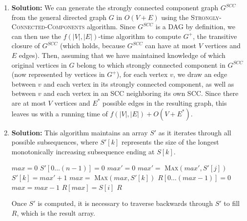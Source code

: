 \documentclass{article}
\begin{document}
\begin{enumerate}
\item \textbf{Solution:}
We can generate the strongly connected component graph $G^{SCC}$ from the general directed graph $G$ in $O(V+E)$ using the \textsc{Strongly-Connected-Components} algorithm. Since $G^{SCC}$ is a DAG by definition, we can then use the $f(|V|,|E|)$-time algorithm to compute $G^{+}$, the transitive closure of $G^{SCC}$ (which holds, because $G^{SCC}$ can have at most $V$ vertices and $E$ edges). Then, assuming that we have maintained knowledge of which original vertices in $G$ belong to which strongly connected component in $G^{SCC}$ (now represented by vertices in $G^{+}$), for each vertex $v$, we draw an edge between $v$ and each vertex in its strongly connected component, as well as between $v$ and each vertex in an SCC neighboring its own SCC. Since there are at most $V$ vertices and $E^{*}$ possible edges in the resulting graph, this leaves us with a running time of $f(|V|,|E|)+O(V+E^{*})$. 

\item \textbf{Solution:}
This algorithm maintains an array $S'$ as it iterates through all possible subsequences, where $S'[k]$ represents the size of the longest monotonically increasing subsequence ending at $S[k]$.
\begin{algorithm}[H]
\caption{}
\begin{algorithmic}
\STATE $max=0$
\STATE $S'[0\dots (n-1)] = 0$
    \STATE $max'=0$
            \STATE $max' = $ \textsc{Max}$(max', S'[j])$
        \ENDIF
    \ENDFOR
    \STATE $S'[k] = max' + 1$
    \STATE $max = $ \textsc{Max}$(max, S'[k])$
\ENDFOR
\STATE $R[0\dots (max-1)] = 0$
        \STATE $max = max-1$
        \STATE $R[max] = S[i]$
    \ENDIF
\ENDFOR
\RETURN $R$
\end{algorithmic}
\end{algorithm}
 Once $S'$ is computed, it is necessary to traverse backwards through $S'$ to fill $R$, which is the result array.
\end{enumerate}
\end{document}
